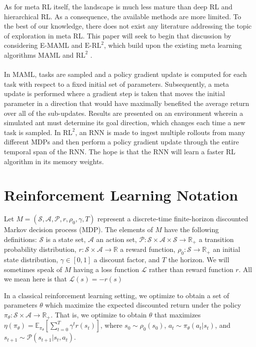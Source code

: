 \documentclass{article} %
\newcommand{\sset}{\mathcal{S}}
\newcommand{\aset}{\mathcal{A}}
\newcommand{\trans}{\mathcal{P}}
\begin{document}
As for meta RL itself, the landscape is much less mature than deep RL and hierarchical RL. As a consequence, the available methods are more limited. To the best of our knowledge, there does not exist any literature addressing the topic of exploration in meta RL. This paper will seek to begin that discussion by considering E-MAML and  $\text{E-RL}^2$, which build upon the existing meta learning algorithms MAML \citep{maml} and $\text{RL}^2$ \citep{rl2}. \\
\\
In MAML, tasks are sampled and a policy gradient update is computed for each task with respect to a fixed initial set of parameters. Subsequently, a meta update is performed where a gradient step is taken that moves the initial parameter in a direction that would have maximally benefited the average return over all of the sub-updates. Results are presented on an environment wherein a simulated ant must determine its goal direction, which changes each time a new task is sampled. In $ \text{RL}^2$, an RNN is made to ingest multiple rollouts from many different MDPs and then perform a policy gradient update through the entire temporal span of the RNN. The hope is that the RNN will learn a faster RL algorithm in its memory weights. 




\section{Reinforcement Learning Notation}
Let $M = (\sset, \aset, \trans, r, \rho_0, \gamma, T)$ represent a discrete-time finite-horizon discounted Markov decision process (MDP). The elements of $M$ have the following definitions: $\sset$ is a state set, $\aset$ an action set, $\trans: \sset \times \aset \times \sset \rightarrow \mathbb{R}_{+}$ a transition probability distribution, $r: \sset \times \aset \rightarrow \mathbb{R}$ a reward function, $\rho_0: \sset \to \mathbb{R}_+$ an initial state distribution, $\gamma \in [0, 1]$ a discount factor, and $T$ the horizon. We will sometimes speak of $M$ having a loss function $\mathcal{L}$ rather than reward function $r$. All we mean here is that $\mathcal{L}(s) = -r(s)$

In a classical reinforcement learning setting, we optimize to obtain a set of parameters $\theta$ which maximize the expected discounted return under the policy $\pi_{\theta}: \sset \times \aset \to \mathbb{R}_+$. That is, we optimize to obtain $\theta$ that maximizes $\eta(\pi_\theta) = \mathbb{E}_{\pi_\theta}[ \sum_{t=0}^T \gamma^t r(s_t) ]$, where $\displaystyle s_0 \sim \rho_0(s_0)$, $a_t \sim \pi_\theta(a_t|s_t)$, and $s_{t+1} \sim \trans(s_{t+1} | s_t, a_t)$.   %
\end{document}

